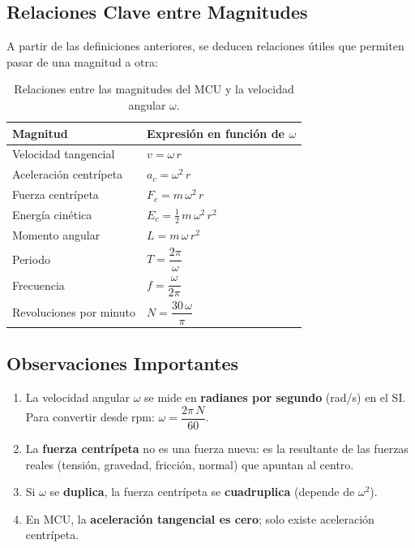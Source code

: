 \documentclass[12pt]{article}
\begin{document}
\subsection*{Relaciones Clave entre Magnitudes}

A partir de las definiciones anteriores, se deducen relaciones útiles que permiten pasar de una magnitud a otra:

\begin{table}[htbp]
\centering
\begin{tabular}{p{6.5cm} p{8cm}}
\toprule
\textbf{Magnitud} & \textbf{Expresión en función de \(\omega\)}\\
\midrule
Velocidad tangencial & \(v = \omega\,r\)\\
Aceleración centrípeta & \(a_c = \omega^2\,r\)\\
Fuerza centrípeta & \(F_c = m\,\omega^2\,r\)\\
Energía cinética & \(E_c = \frac{1}{2}\,m\,\omega^2\,r^2\)\\
Momento angular & \(L = m\,\omega\,r^2\)\\
Periodo & \(T = \dfrac{2\pi}{\omega}\)\\
Frecuencia & \(f = \dfrac{\omega}{2\pi}\)\\
Revoluciones por minuto & \(N = \dfrac{30\,\omega}{\pi}\)\\
\bottomrule
\end{tabular}
\caption{Relaciones entre las magnitudes del MCU y la velocidad angular \(\omega\).}
\end{table}

\subsection*{Observaciones Importantes}

\begin{enumerate}
  \item La velocidad angular \(\omega\) se mide en \textbf{radianes por segundo} (rad/s) en el SI. Para convertir desde rpm: \(\omega = \dfrac{2\pi\,N}{60}\).
  \item La \textbf{fuerza centrípeta} no es una fuerza nueva: es la resultante de las fuerzas reales (tensión, gravedad, fricción, normal) que apuntan al centro.
  \item Si \(\omega\) se \textbf{duplica}, la fuerza centrípeta se \textbf{cuadruplica} (depende de \(\omega^2\)).
  \item En MCU, la \textbf{aceleración tangencial es cero}; solo existe aceleración centrípeta.
\end{enumerate}
\end{document}
